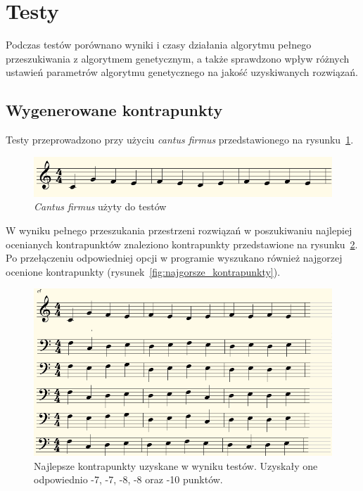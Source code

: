 \documentclass{article}
\begin{document}
\section{Testy}

Podczas testów porównano wyniki i czasy działania algorytmu pełnego przeszukiwania z algorytmem genetycznym, a także sprawdzono wpływ różnych ustawień parametrów algorytmu genetycznego na jakość uzyskiwanych rozwiązań.

\subsection{Wygenerowane kontrapunkty}

Testy przeprowadzono przy użyciu \emph{cantus firmus} przedstawionego na rysunku~\ref{fig:testowy_cantus_firmus}.

\begin{figure}[htb]
\centering
\includegraphics[width=1.0\textwidth]{images/testowy_cantus_firmus.png}
\caption{\emph{Cantus firmus} użyty do testów}
\label{fig:testowy_cantus_firmus}
\end{figure}

W wyniku pełnego przeszukania przestrzeni rozwiązań w poszukiwaniu najlepiej ocenianych kontrapunktów znaleziono kontrapunkty przedstawione na rysunku~\ref{fig:najlepsze_kontrapunkty}. Po przełączeniu odpowiedniej opcji w programie wyszukano również najgorzej ocenione kontrapunkty (rysunek~\ref{fig:najgorsze_kontrapunkty}).

\begin{figure}[htb]
\centering
\includegraphics[width=1.0\textwidth]{images/najlepsze_kontrapunkty.png}
\caption{Najlepsze kontrapunkty uzyskane w wyniku testów. Uzyskały one odpowiednio -7, -7, -8, -8 oraz -10 punktów.}
\label{fig:najlepsze_kontrapunkty}
\end{figure}
\end{document}
